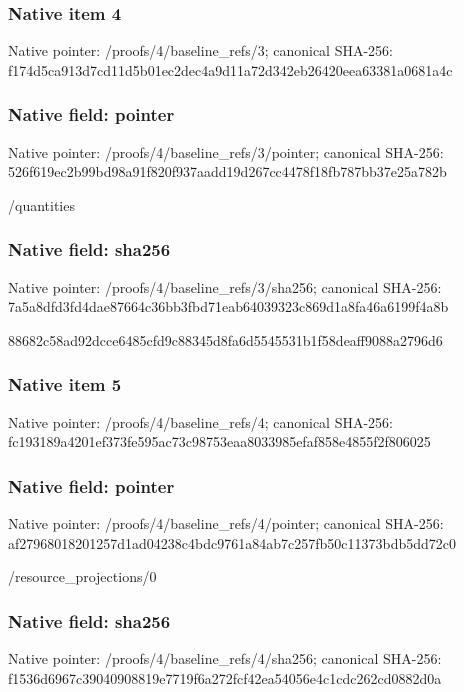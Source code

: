 \documentclass[10pt,a4paper]{article}
\begin{document}
\subsubsection{Native item 4}
Native pointer: /proofs/4/baseline\_\allowbreak{}refs/3; canonical SHA-256: f174d5ca913d7cd11d5b01ec2dec4a9d11a72d342eb26420eea63381a0681a4c

\subsubsection{Native field: pointer}
Native pointer: /proofs/4/baseline\_\allowbreak{}refs/3/pointer; canonical SHA-256: 526f619ec2b99bd98a91f820f937aadd19d267cc4478f18fb787bb37e25a782b

\begingroup\raggedright\sloppy /\allowbreak{}quantities\par\endgroup

\subsubsection{Native field: sha256}
Native pointer: /proofs/4/baseline\_\allowbreak{}refs/3/sha256; canonical SHA-256: 7a5a8dfd3fd4dae87664c36bb3fbd71eab64039323c869d1a8fa46a6199f4a8b

\begingroup\raggedright\sloppy 88682c58ad92dcce6485cfd9c88345d8fa6d5545531b1f58deaff9088a2796d6\par\endgroup

\subsubsection{Native item 5}
Native pointer: /proofs/4/baseline\_\allowbreak{}refs/4; canonical SHA-256: fc193189a4201ef373fe595ac73c98753eaa8033985efaf858e4855f2f806025

\subsubsection{Native field: pointer}
Native pointer: /proofs/4/baseline\_\allowbreak{}refs/4/pointer; canonical SHA-256: af27968018201257d1ad04238c4bdc9761a84ab7c257fb50c11373bdb5dd72c0

\begingroup\raggedright\sloppy /\allowbreak{}resource\_\allowbreak{}projections/\allowbreak{}0\par\endgroup

\subsubsection{Native field: sha256}
Native pointer: /proofs/4/baseline\_\allowbreak{}refs/4/sha256; canonical SHA-256: f1536d6967c39040908819e7719f6a272fcf42ea54056e4c1cdc262cd0882d0a
\end{document}
